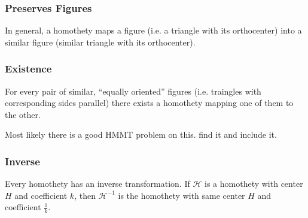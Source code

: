 \documentclass[11pt,twoside]{scrartcl}
\begin{document}
\subsubsection{Preserves Figures}
In general, a homothety maps a figure (i.e. a triangle with its orthocenter) into a similar figure (similar triangle with its orthocenter).

\subsubsection{Existence}
For every pair of similar, ``equally oriented'' figures (i.e. traingles with corresponding sides parallel) there exists a homothety mapping one of them to the other.

\begin{note}
    Most likely there is a good HMMT problem on this. \TBD find it and include it.
\end{note}

\subsubsection{Inverse}
Every homothety has an inverse transformation. If $\mathcal{H}$ is a homothety with center $H$ and coefficient $k$, then $\mathcal{H}^{-1}$ is the homothety with same center $H$ and coefficient $\frac{1}{k}$.
\end{document}
